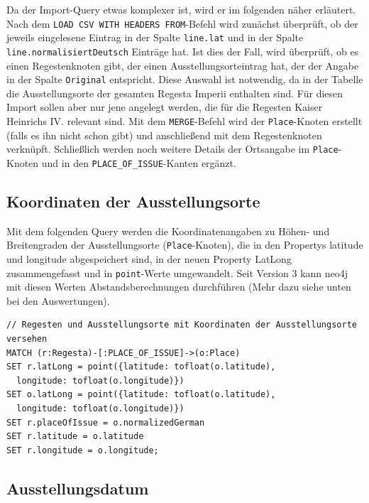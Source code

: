 \documentclass[ngerman,]{scrreprt}
\begin{document}
Da der Import-Query etwas komplexer ist, wird er im folgenden näher erläutert. Nach dem \texttt{LOAD\ CSV\ WITH\ HEADERS\ FROM}-Befehl wird zunächst überprüft, ob der jeweils eingelesene Eintrag in der Spalte \texttt{line.lat} und in der Spalte \texttt{line.normalisiertDeutsch} Einträge hat. Ist dies der Fall, wird überprüft, ob es einen Regestenknoten gibt, der einen Ausstellungsorteintrag hat, der der Angabe in der Spalte \texttt{Original} entspricht. Diese Auswahl ist notwendig, da in der Tabelle die Ausstellungsorte der gesamten Regesta Imperii enthalten sind. Für diesen Import sollen aber nur jene angelegt werden, die für die Regesten Kaiser Heinrichs IV. relevant sind. Mit dem \texttt{MERGE}-Befehl wird der \texttt{Place}-Knoten erstellt (falls es ihn nicht schon gibt) und anschließend mit dem Regestenknoten verknüpft. Schließlich werden noch weitere Details der Ortsangabe im \texttt{Place}-Knoten und in den \texttt{PLACE\_OF\_ISSUE}-Kanten ergänzt.

\hypertarget{koordinaten-der-ausstellungsorte}{%
\subsection{Koordinaten der Ausstellungsorte}\label{koordinaten-der-ausstellungsorte}}

Mit dem folgenden Query werden die Koordinatenangaben zu Höhen- und Breitengraden der Ausstellungsorte (\texttt{Place}-Knoten), die in den Propertys latitude und longitude abgespeichert sind, in der neuen Property LatLong zusammengefasst und in \texttt{point}-Werte umgewandelt. Seit Version 3 kann neo4j mit diesen Werten Abstandsberechnungen durchführen (Mehr dazu siehe unten bei den Auswertungen).

\begin{verbatim}
// Regesten und Ausstellungsorte mit Koordinaten der Ausstellungsorte versehen
MATCH (r:Regesta)-[:PLACE_OF_ISSUE]->(o:Place)
SET r.latLong = point({latitude: tofloat(o.latitude),
  longitude: tofloat(o.longitude)})
SET o.latLong = point({latitude: tofloat(o.latitude),
  longitude: tofloat(o.longitude)})
SET r.placeOfIssue = o.normalizedGerman
SET r.latitude = o.latitude
SET r.longitude = o.longitude;
\end{verbatim}

\hypertarget{ausstellungsdatum}{%
\subsection{Ausstellungsdatum}\label{ausstellungsdatum}}
\end{document}
